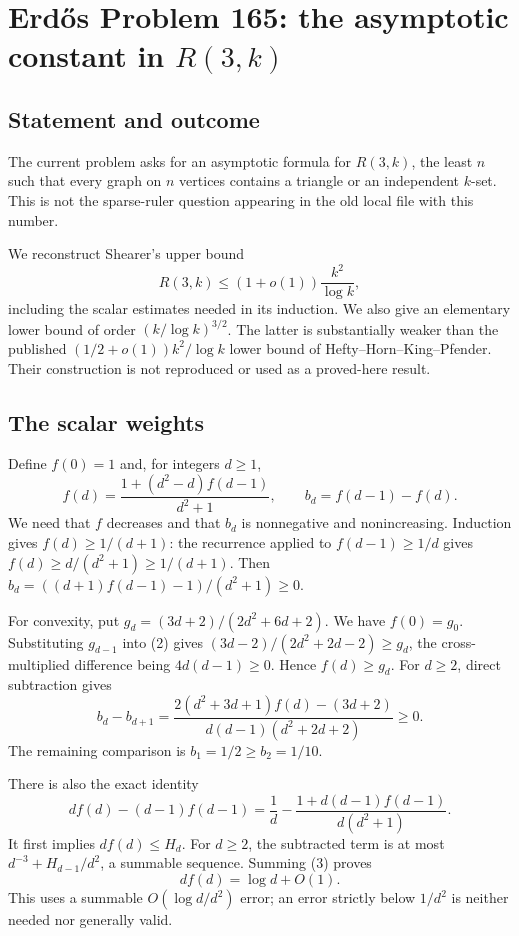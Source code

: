 \section*{Erd\H{o}s Problem 165: the asymptotic constant in $R(3,k)$}
\subsection*{Statement and outcome}
The current problem asks for an asymptotic formula for $R(3,k)$, the least $n$ such that every graph on $n$ vertices contains a triangle or an independent $k$-set. This is not the sparse-ruler question appearing in the old local file with this number.

We reconstruct Shearer's upper bound
\[
 R(3,k)\le(1+o(1))\frac{k^2}{\log k},
 \tag{1}
\]
including the scalar estimates needed in its induction. We also give an elementary lower bound of order $(k/\log k)^{3/2}$. The latter is substantially weaker than the published $(1/2+o(1))k^2/\log k$ lower bound of Hefty--Horn--King--Pfender. Their construction is not reproduced or used as a proved-here result.

\subsection*{The scalar weights}
Define $f(0)=1$ and, for integers $d\ge1$,
\[
 f(d)=\frac{1+(d^2-d)f(d-1)}{d^2+1},
 \qquad b_d=f(d-1)-f(d).
 \tag{2}
\]
We need that $f$ decreases and that $b_d$ is nonnegative and nonincreasing.
Induction gives $f(d)\ge1/(d+1)$: the recurrence applied to
$f(d-1)\ge1/d$ gives $f(d)\ge d/(d^2+1)\ge1/(d+1)$.
Then
$b_d=((d+1)f(d-1)-1)/(d^2+1)\ge0$.

For convexity, put $g_d=(3d+2)/(2d^2+6d+2)$. We have $f(0)=g_0$. Substituting $g_{d-1}$ into (2) gives
$(3d-2)/(2d^2+2d-2)\ge g_d$, the cross-multiplied difference being $4d(d-1)\ge0$. Hence $f(d)\ge g_d$. For $d\ge2$, direct subtraction gives
\[
 b_d-b_{d+1}
 =\frac{2(d^2+3d+1)f(d)-(3d+2)}
 {d(d-1)(d^2+2d+2)}\ge0.
\]
The remaining comparison is $b_1=1/2\ge b_2=1/10$.

There is also the exact identity
\[
 d f(d)-(d-1)f(d-1)
 =\frac1d-\frac{1+d(d-1)f(d-1)}{d(d^2+1)}.
 \tag{3}
\]
It first implies $d f(d)\le H_d$. For $d\ge2$, the subtracted term is at most
$d^{-3}+H_{d-1}/d^2$, a summable sequence. Summing (3) proves
\[
 d f(d)=\log d+O(1). \tag{4}
\]
This uses a summable $O(\log d/d^2)$ error; an error strictly below $1/d^2$ is neither needed nor generally valid.

